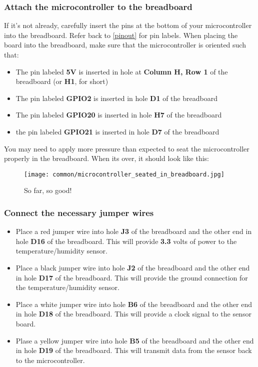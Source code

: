 \subsubsection{Attach the microcontroller to the breadboard}
If it's not already, carefully insert the pins at the bottom of your microcontroller into the breadboard. Refer back
to \ref{pinout} for pin labels. When placing the board into the breadboard, make sure that the microcontroller is oriented such that:
\begin{itemize}
    \item The pin labeled \textbf{5V} is inserted in hole at \textbf{Column H, Row 1} of the breadboard (or \textbf{H1}, for short)
    \item The pin labeled \textbf{GPIO2} is inserted in hole \textbf{D1} of the breadboard
    \item The pin labeled \textbf{GPIO20} is inserted in hole \textbf{H7} of the breadboard
    \item the pin labeled \textbf{GPIO21} is inserted in hole \textbf{D7} of the breadboard
\end{itemize}
You may need to apply more pressure than expected to seat the microcontroller properly in the breadboard. When its over, it should look like this:
\begin{figure}[H]
    \centering
    \texttt{[image: common/microcontroller\_seated\_in\_breadboard.jpg]}
    \caption{So far, so good!}
\end{figure}

\subsubsection{Connect the necessary jumper wires}
\begin{itemize}
    \item Place a red jumper wire into hole \textbf{J3} of the breadboard and the other end in
    hole \textbf{D16} of the breadboard. This will provide \textbf{3.3} volts of power to the temperature/humidity sensor.
    \item Place a black jumper wire into hole \textbf{J2} of the breadboard and the other
    end in hole \textbf{D17} of the breadboard. This will provide the ground connection for the temperature/humidity sensor.
    \item Place a white jumper wire into hole \textbf{B6} of the breadboard and the other
    end in hole \textbf{D18} of the breadboard. This will provide a clock signal to the sensor board.
    \item Plase a yellow jumper wire into hole \textbf{B5} of the breadboard and the other
    end in hole \textbf{D19} of the breadboard. This will transmit data from the sensor back to the microcontroller.
\end{itemize}


